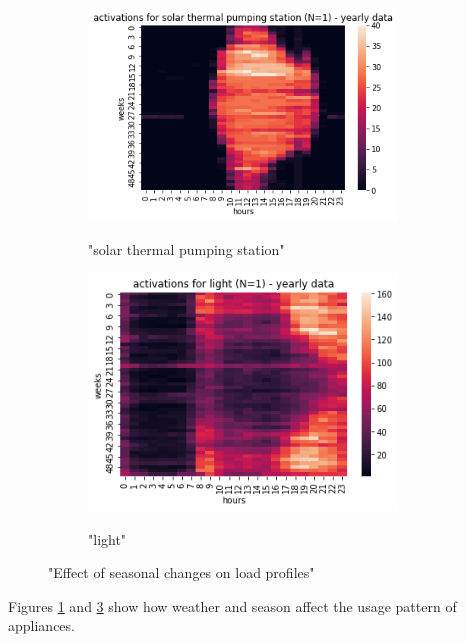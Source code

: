 \begin{figure}[H]
	\begin{subfigure}{.5\textwidth}
		\centering
		\caption{"solar thermal pumping station"}
		\includegraphics[width=0.9\textwidth]{../Figures/LPS/solar termal pumping station.png}
		\label{fig:solar thermal pumping station}
	\end{subfigure}%
	\begin{subfigure}{.5\textwidth}
		\centering
		\caption{"light"}
		\includegraphics[width=0.9\textwidth]{../Figures/LPS/light.png}
		\label{fig:light}
	\end{subfigure}%
	\caption{"Effect of seasonal changes on load profiles"}
\end{figure}

Figures \ref{fig:solar thermal pumping station} and \ref{fig:light} 
show how weather and season affect the usage pattern of appliances.


